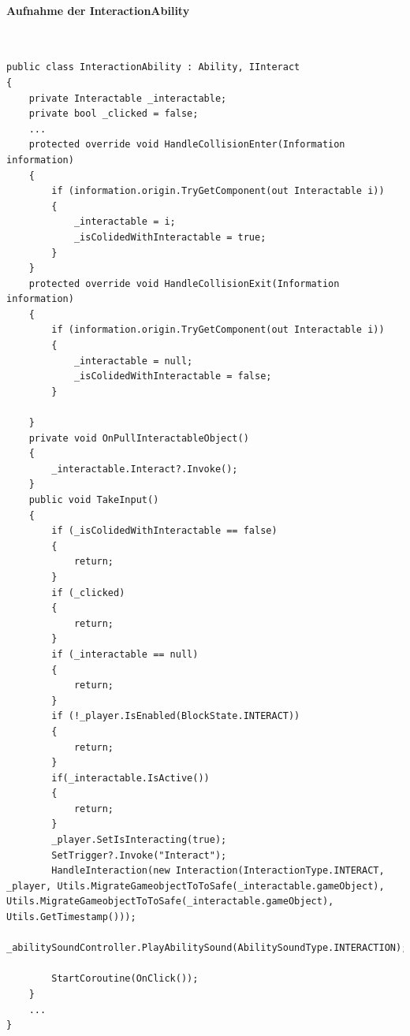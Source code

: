 \paragraph{Aufnahme der InteractionAbility}
~
\begin{lstlisting}[caption={Ausschnitt aus InteractionAbility.cs Klasse}, label={lst:interaction-ability}]
public class InteractionAbility : Ability, IInteract
{
    private Interactable _interactable;
    private bool _clicked = false;
    ...
    protected override void HandleCollisionEnter(Information information)
    {
        if (information.origin.TryGetComponent(out Interactable i))
        {
            _interactable = i;
            _isColidedWithInteractable = true;
        }
    }
    protected override void HandleCollisionExit(Information information)
    {
        if (information.origin.TryGetComponent(out Interactable i))
        {
            _interactable = null;
            _isColidedWithInteractable = false;
        }

    }
    private void OnPullInteractableObject()
    {
        _interactable.Interact?.Invoke();
    }
    public void TakeInput()
    {
        if (_isColidedWithInteractable == false)
        {
            return;
        }
        if (_clicked)
        {
            return;
        }
        if (_interactable == null)
        {
            return;
        }
        if (!_player.IsEnabled(BlockState.INTERACT))
        {
            return;
        }
        if(_interactable.IsActive())
        {
            return;
        }
        _player.SetIsInteracting(true);
        SetTrigger?.Invoke("Interact");
        HandleInteraction(new Interaction(InteractionType.INTERACT, _player, Utils.MigrateGameobjectToToSafe(_interactable.gameObject), Utils.MigrateGameobjectToToSafe(_interactable.gameObject), Utils.GetTimestamp()));
        _abilitySoundController.PlayAbilitySound(AbilitySoundType.INTERACTION);

        StartCoroutine(OnClick());
    }
    ...
}
\end{lstlisting}

